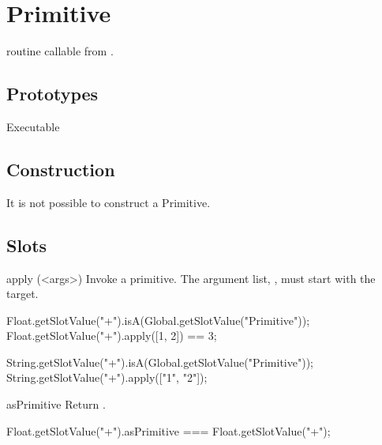 
\section{Primitive}
\Cxx routine callable from \us.

\subsection{Prototypes}
\begin{refObjects}
\item[Executable]
\end{refObjects}

\subsection{Construction}

It is not possible to construct a Primitive.

\subsection{Slots}

\begin{urbiscriptapi}
\item[apply](<args>)%
  Invoke a primitive.  The argument list, , must start with
  the target.
\begin{urbiassert}
Float.getSlotValue("+").isA(Global.getSlotValue("Primitive"));
Float.getSlotValue("+").apply([1, 2]) == 3;

String.getSlotValue("+").isA(Global.getSlotValue("Primitive"));
String.getSlotValue("+").apply(["1", "2"]);
\end{urbiassert}

\item[asPrimitive] Return \this.
\begin{urbiassert}
Float.getSlotValue("+").asPrimitive === Float.getSlotValue("+");
\end{urbiassert}
\end{urbiscriptapi}


